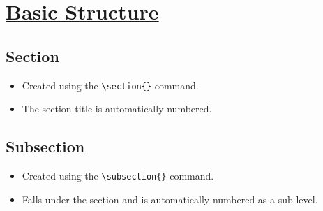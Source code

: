 \documentclass{article}
\begin{document}
\section{\underline{Basic Structure}}

\subsection{Section}
\begin{itemize}
    \item Created using the \texttt{\textbackslash section\{\}} command.
    \item The section title is automatically numbered.
\end{itemize}

\subsection{Subsection}
\begin{itemize}
    \item Created using the \texttt{\textbackslash subsection\{\}} command.
    \item Falls under the section and is automatically numbered as a sub-level.
\end{itemize}
\end{document}
